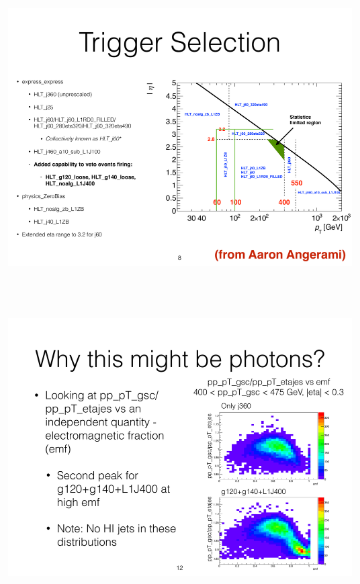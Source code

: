 


\begin{figure}
\centering
\begin{subfigure}[b]{\textwidth}
    \centering
    \includegraphics[width=\textwidth]{figures/qualification/TrigMap.pdf}
    \caption{}
    \label{a}
\end{subfigure} \\
\begin{subfigure}[b]{\textwidth}
    \centering
    \includegraphics[width=\textwidth]{figures/qualification/PhotonEx.pdf}

\end{subfigure}
\end{figure}
